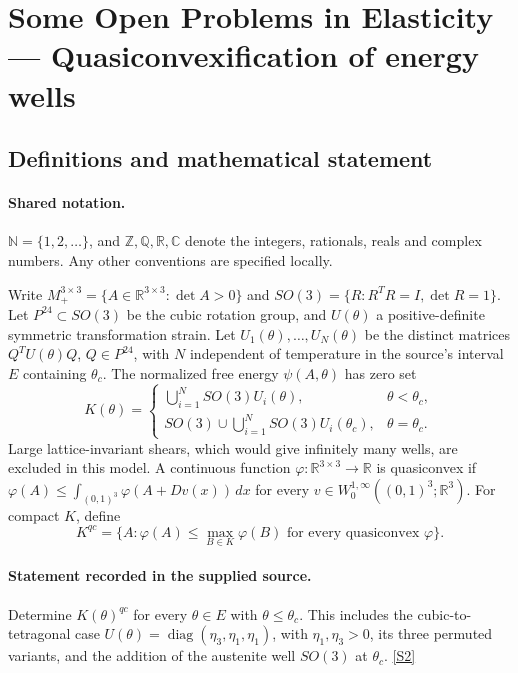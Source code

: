 \documentclass[11pt]{article}
\newcommand{\sref}[2]{\hyperlink{source:#1:#2}{[S#2]}}
\begin{document}
\section{Some Open Problems in Elasticity — Quasiconvexification of energy wells}\label{statement}

\subsection{Definitions and mathematical statement}

\paragraph{Shared notation.}$\mathbb N=\{1,2,\ldots\}$, and $\mathbb Z,\mathbb Q,\mathbb R,\mathbb C$ denote the integers, rationals, reals and complex numbers. Any other conventions are specified locally.


Write $M_+^{3\times3}=\{A\in\mathbb R^{3\times3}:\det A>0\}$ and $SO(3)=\{R:R^TR=I,\det R=1\}$. Let $P^{24}\subset SO(3)$ be the cubic rotation group, and $U(\theta)$ a positive-definite symmetric transformation strain. Let $U_1(\theta),\ldots,U_N(\theta)$ be the distinct matrices $Q^TU(\theta)Q$, $Q\in P^{24}$, with $N$ independent of temperature in the source's interval $E$ containing $\theta_c$. The normalized free energy $\psi(A,\theta)$ has zero set \[K(\theta)=\begin{cases}\displaystyle\bigcup_{i=1}^N SO(3)U_i(\theta),&\theta<\theta_c,\\\displaystyle SO(3)\cup\bigcup_{i=1}^N SO(3)U_i(\theta_c),&\theta=\theta_c.\end{cases}\] Large lattice-invariant shears, which would give infinitely many wells, are excluded in this model. A continuous function $\varphi:\mathbb R^{3\times3}\to\mathbb R$ is quasiconvex if $\varphi(A)\le\int_{(0,1)^3}\varphi(A+Dv(x))\,dx$ for every $v\in W^{1,\infty}_0((0,1)^3;\mathbb R^3)$. For compact $K$, define \[K^{qc}=\{A:\varphi(A)\le\max_{B\in K}\varphi(B)\text{ for every quasiconvex }\varphi\}.\]
\paragraph{Statement recorded in the supplied source.}
Determine $K(\theta)^{qc}$ for every $\theta\in E$ with $\theta\le\theta_c$. This includes the cubic-to-tetragonal case $U(\theta)=\operatorname{diag}(\eta_3,\eta_1,\eta_1)$, with $\eta_1,\eta_3>0$, its three permuted variants, and the addition of the austenite well $SO(3)$ at $\theta_c$. \sref{statement}{2}
\end{document}
